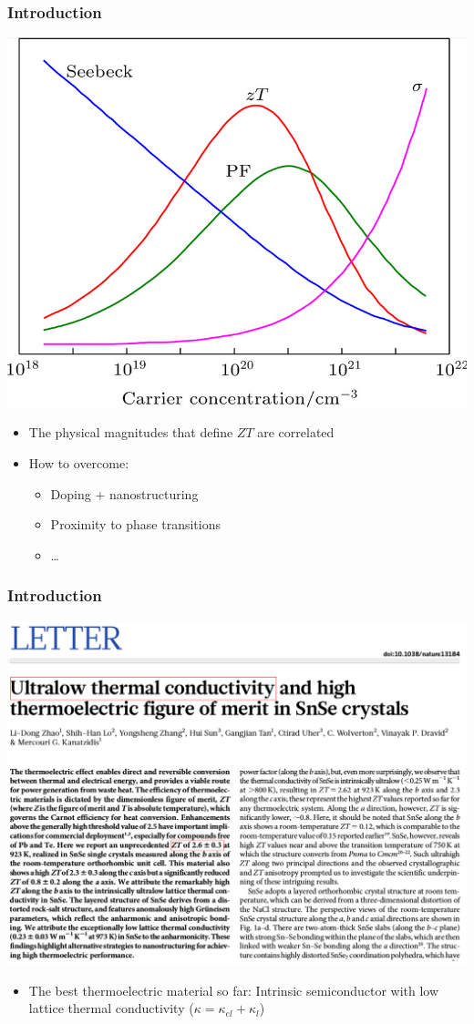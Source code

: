 \documentclass{beamer}
\begin{document}
\begin{frame}

\frametitle{Introduction}
\vspace{-0.5cm}
\begin{center}
\includegraphics[width=0.5\linewidth]{Pictures/INTRO/decoupling.png}
\end{center}
\vspace{-0.1cm}
\begin{itemize}
\item The physical magnitudes that define $ZT$ are correlated
\item How to overcome:
	\begin{itemize}
	\item Doping + nanostructuring
	\item Proximity to phase transitions
	\item \dots
	\end{itemize}
\end{itemize}

\end{frame}

\begin{frame}

\frametitle{Introduction}
\vspace{-0.5cm}
\begin{center}
\includegraphics[width=0.7\linewidth]{Pictures/INTRO/natureSnSe.pdf}
\end{center}
\begin{itemize}
\item The best thermoelectric material so far: Intrinsic semiconductor with low lattice thermal 
conductivity ($\kappa=\kappa_{el} + \kappa_{l}$) 
\end{itemize}

\end{frame}
\end{document}
